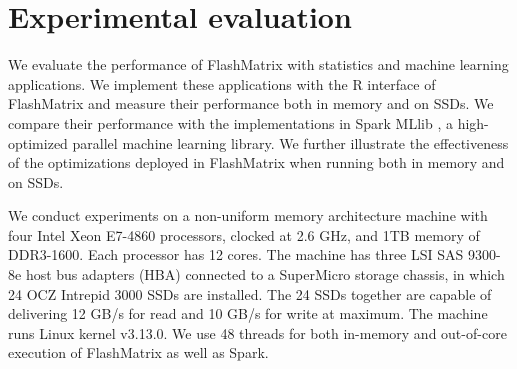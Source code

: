 \section{Experimental evaluation}
We evaluate the performance of FlashMatrix with statistics and machine learning
applications. We implement these applications with the R interface of FlashMatrix
and measure their performance both in memory and on SSDs. We compare their
performance with the implementations in Spark MLlib \cite{mllib}, a high-
optimized parallel machine learning library. We further
illustrate the effectiveness of the optimizations deployed in FlashMatrix
when running both in memory and on SSDs.

We conduct experiments on a non-uniform memory architecture machine with
four Intel Xeon E7-4860 processors, clocked at 2.6 GHz, and 1TB memory of
DDR3-1600. Each processor has 12 cores. The machine has three LSI SAS 9300-8e
host bus adapters (HBA) connected to a SuperMicro storage chassis, in which
24 OCZ Intrepid 3000 SSDs are installed. The 24 SSDs together are capable of
delivering 12 GB/s for read and 10 GB/s for write at maximum. The machine runs
Linux kernel v3.13.0. We use 48 threads for both in-memory and out-of-core
execution of FlashMatrix as well as Spark.


